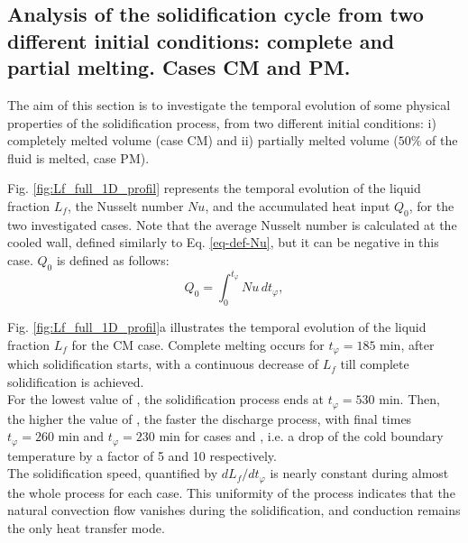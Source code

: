 \subsection{Analysis of the solidification cycle from two different initial conditions: complete and partial melting. Cases CM and PM. }
 \label{sec_freezing_full} 

The aim of this section is to investigate the temporal evolution of some physical properties of the solidification process, from two different initial conditions: i) completely melted volume (case CM) and ii) partially melted volume ($50\%$ of the fluid is melted, case PM).  
 
Fig. \ref{fig:Lf_full_1D_profil} represents the temporal  evolution of the liquid fraction $L_f$, the Nusselt number $N\!u$, and the accumulated heat input  $Q_0$, for the two investigated cases.
Note that the average Nusselt number is calculated at the cooled wall, defined similarly to Eq. \ref{eq-def-Nu}, but it can be negative in this case. $Q_0$ is defined as follows:
\begin{equation}
    Q_0 = \int_0^{t_{\varphi}} N\!u \, d t_{\varphi},
    \label{eq-Q0}
\end{equation}


Fig. \ref{fig:Lf_full_1D_profil}a illustrates the temporal evolution of the liquid fraction $L_f$ for the CM case. 
Complete melting occurs for $t_{\varphi} =185$ min, after which solidification starts, with a continuous decrease of $L_f$ till complete solidification is achieved. \\
For the lowest value of , the solidification process ends at $t_{\varphi} = 530$ min. 
Then, the higher the value of , the faster the discharge process,
with final times $t_{\varphi} = 260$ min and $t_{\varphi} = 230$ min for cases  and , i.e. a drop of the cold boundary temperature by a factor of 5 and 10 respectively. \\
The solidification speed, quantified by $d L_f/ d t_{\varphi}$ is  nearly constant during almost the whole process for each case.  
This uniformity of the process indicates that the natural convection flow vanishes during the solidification, and conduction remains the only heat transfer mode.   

